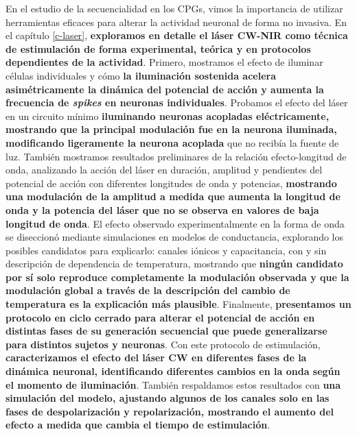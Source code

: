 En el estudio de la secuencialidad en los CPGs, vimos la importancia de utilizar herramientas eficaces para alterar la actividad neuronal de forma no invasiva. En el capítulo \ref{c-laser}, \textbf{exploramos en detalle el láser CW-NIR como técnica de estimulación de forma experimental, teórica y en protocolos dependientes de la actividad}. Primero, mostramos el efecto de iluminar células individuales y cómo \textbf{la iluminación sostenida acelera asimétricamente la dinámica del potencial de acción y aumenta la frecuencia de  \textit{spikes} en neuronas individuales}. Probamos el efecto del láser en un circuito mínimo \textbf{iluminando neuronas acopladas eléctricamente, mostrando que la principal modulación fue en la neurona iluminada, modificando ligeramente la neurona acoplada} que no recibía la fuente de luz. También mostramos resultados preliminares de la relación efecto-longitud de onda, analizando la acción del láser en duración, amplitud y pendientes del potencial de acción con diferentes longitudes de onda y potencias, \textbf{mostrando una modulación de la amplitud a medida que aumenta la longitud de onda y la potencia del láser que no se observa en valores de baja longitud de onda}. El efecto observado experimentalmente en la forma de onda se diseccionó mediante simulaciones en modelos de conductancia, explorando los posibles candidatos para explicarlo: canales iónicos y capacitancia, con y sin descripción de dependencia de temperatura, mostrando que \textbf{ningún candidato por sí solo reproduce completamente la modulación observada y que la modulación global a través de la descripción del cambio de temperatura es la explicación más plausible}. Finalmente, \textbf{presentamos un protocolo en ciclo cerrado para alterar el potencial de acción en distintas fases de su generación secuencial que puede generalizarse para distintos sujetos y neuronas}. Con este protocolo de estimulación, \textbf{caracterizamos el efecto del láser CW en diferentes fases de la dinámica neuronal, identificando diferentes cambios en la onda según el momento de iluminación}. También respaldamos estos resultados con \textbf{una simulación del modelo, ajustando algunos de los canales solo en las fases de despolarización y repolarización, mostrando el aumento del efecto a medida que cambia el tiempo de estimulación}.

